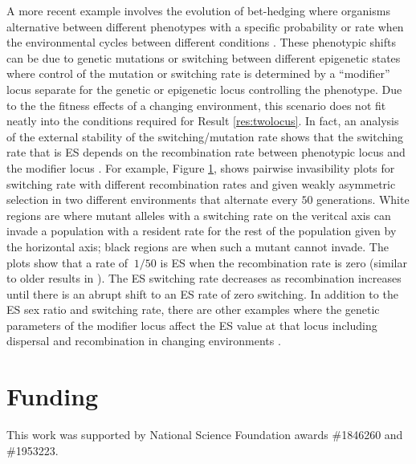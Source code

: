 \documentclass[11pt]{article}
\begin{document}
\begin{figure}[t!]
  \label{fig:pip:switching}
\end{figure}

A more recent example involves the evolution of bet-hedging where organisms alternative between different phenotypes with a specific probability or rate when the environmental cycles between different conditions \cite{Seger:Brockmann:1987,Slatkin:1974}. These phenotypic shifts can be due to genetic mutations \cite{Leigh:1970,Ishii:Matsuda:1989} or switching between different epigenetic states  \cite{Kussell:Leibler:2005,Salathe:VanCleve:2009} where control of the mutation or switching rate is determined by a ``modifier'' locus separate for the genetic or epigenetic locus controlling the phenotype. Due to the the fitness effects of a changing environment, this scenario does not fit neatly into the conditions required for Result \ref{res:twolocus}. In fact, an analysis of the external stability of the switching/mutation rate shows that the switching rate that is ES depends on the recombination rate between phenotypic locus and the modifier locus \cite{Liberman:VanCleve:2011}. For example, Figure \ref{fig:pip:switching}, shows pairwise invasibility plots for switching rate with different recombination rates and given weakly asymmetric selection in two different environments that alternate every $50$ generations. White regions are where mutant alleles with a switching rate on the veritcal axis can invade a population with a resident rate for the rest of the population given by the horizontal axis; black regions are when such a mutant cannot invade. The plots show that a rate of $~1/50$ is ES when the recombination rate is zero (similar to older results in \cite{Leigh:1970,Lachmann:Jablonka:1996}). The ES switching rate decreases as recombination increases until there is an abrupt shift to an ES rate of zero switching. In addition to the ES sex ratio and switching rate, there are other examples where the genetic parameters of the modifier locus affect the ES value at that locus including dispersal and recombination in changing environments \cite{Carja:Liberman:2014}.



\section{Funding}

This work was supported by National Science Foundation awards \#1846260 and \#1953223.

\clearpage
\printbibliography
\end{document}
